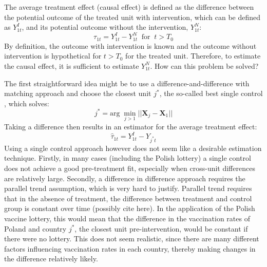 \documentclass{scrbook}
\begin{document}
The average treatment effect (causal effect) is defined as the
difference between the potential outcome of the treated unit with
intervention, which can be defined as \(Y_{1t}^{I}\), and its potential
outcome without the intervention, \(Y_{1t}^{N}\): \begin{equation}
\tau_{1t}=Y_{1t}^{I}-Y_{1t}^{N}\; \; \text{for}\; \; t>T_{0}
\end{equation} By definition, the outcome with intervention is known and
the outcome without intervention is hypothetical for \(t>T_{0}\) for the
treated unit. Therefore, to estimate the causal effect, it is sufficient
to estimate \(Y_{1t}^{N}\). How can this problem be solved?

The first straightforward idea might be to use a
difference-and-difference with matching approach and choose the closest
unit \(j^{*}\), the so-called best single control
\parencite{doudchenko_balancing_2016}, which solves: \begin{equation}
j^{*}=\text{arg}\; \min_{j>1}\vert\vert\mathbf{X}_{j}-\mathbf{X}_{1}\vert\vert
\end{equation} Taking a difference then results in an estimator for the
average treatment effect: \begin{equation}
\hat{\tau}_{1t}=Y_{1t}^{I}-Y_{j^{*}t}
\end{equation} Using a single control approach however does not seem
like a desirable estimation technique. Firstly, in many cases (including
the Polish lottery) a single control does not achieve a good
pre-treatment fit, especially when cross-unit differences are relatively
large. Secondly, a difference in difference approach requires the
parallel trend assumption, which is very hard to justify. Parallel trend
requires that in the absence of treatment, the difference between
treatment and control group is constant over time (possibly cite here).
In the application of the Polish vaccine lottery, this would mean that
the difference in the vaccination rates of Poland and country \(j^{*}\),
the closest unit pre-intervention, would be constant if there were no
lottery. This does not seem realistic, since there are many different
factors influencing vaccination rates in each country, thereby making
changes in the difference relatively likely.
\end{document}
